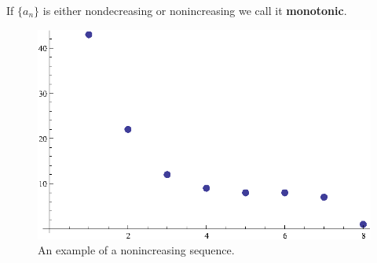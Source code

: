 \begin{defn}
  If \(\{a_n\}\) is either nondecreasing or nonincreasing we call it \textbf{monotonic}.
  \begin{figure}[H]
    \begin{center}
      \includegraphics[scale=0.5]{continuous/sequence/nonincreasing}
    \end{center}
    \caption{An example of a nonincreasing sequence.}
  \end{figure}
\end{defn}

